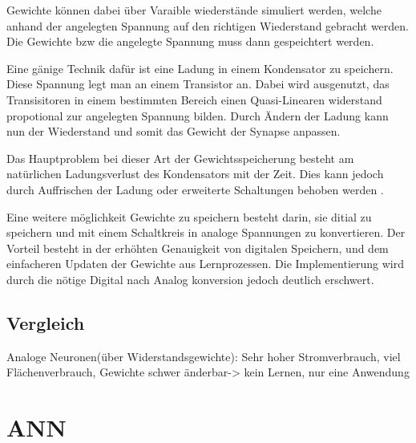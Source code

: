 \documentclass[conference]{IEEEtran}
\begin{document}
    Gewichte können dabei über Varaible wiederstände simuliert werden, welche anhand der angelegten Spannung auf den richtigen Wiederstand gebracht werden.
    Die Gewichte bzw die angelegte Spannung muss dann gespeichtert werden.


    Eine gänige Technik dafür ist eine Ladung in einem Kondensator zu speichern.
    Diese Spannung legt man an einem Transistor an.
    Dabei wird ausgenutzt, das Transisitoren in einem bestimmten Bereich einen Quasi-Linearen widerstand propotional zur angelegten Spannung bilden.
    Durch Ändern der Ladung kann nun der Wiederstand und somit das Gewicht der Synapse anpassen.

    Das Hauptproblem bei dieser Art der Gewichtsspeicherung besteht am natürlichen Ladungsverlust des Kondensators mit der Zeit.
    Dies kann jedoch durch Auffrischen der Ladung oder erweiterte Schaltungen behoben werden \cite{reed1989multiple} .


    Eine weitere möglichkeit Gewichte zu speichern besteht darin, sie ditial zu speichern und mit einem Schaltkreis in analoge Spannungen zu konvertieren.
    Der Vorteil besteht in der erhöhten Genauigkeit von digitalen Speichern, und dem einfacheren Updaten der Gewichte aus Lernprozessen.
    Die Implementierung wird durch die nötige Digital nach Analog konversion jedoch deutlich erschwert.



    \subsection{Vergleich}

    Analoge Neuronen(über Widerstandsgewichte): Sehr hoher Stromverbrauch, viel Flächenverbrauch, Gewichte schwer änderbar-> kein Lernen, nur eine Anwendung

    \section{ANN}

\end{document}
